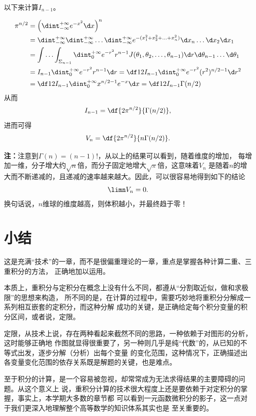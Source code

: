 以下来计算$I_{n-1}$。

\begin{align*}
	\pi^{n/2}&=\left(\dint_{-\infty}^{+\infty}e^{-x^2}\d x\right)^n\\
	&=\dint_{-\infty}^{+\infty}\dint_{-\infty}^{+\infty}\ldots
	\dint_{-\infty}^{+\infty}e^{-(x_1^2+x_2^2+\ldots+x_n^2)}\d x_n\ldots
	\d x_2\d x_1\\
	&=\int\ldots\int_{\Sigma_{n-1}}\dint_0^{+\infty}
	e^{-r^2}r^{n-1}J(\theta_1,\theta_2,\ldots,\theta_{n-1})
	\d r\d\theta_{n-1}\ldots\d\theta_1\\
	&=I_{n-1}\dint_0^{+\infty}e^{-r^2}r^{n-1}\d r
	=\df12I_{n-1}\dint_0^{+\infty}e^{-r^2}(r^2)^{n/2-1}\d r^2\\
	&=\df12I_{n-1}\dint_0^{+\infty}x^{n/2-1}e^{-x}\d x
	=\df12I_{n-1}\Gamma(n/2)
\end{align*}
从而
$$I_{n-1}=\df{2\pi^{n/2}}{\Gamma(n/2)},$$
进而可得
$$V_n=\df{2\pi^{n/2}}{n\Gamma(n/2)}.$$

{\bf 注：}注意到$\Gamma(n)=(n-1)!$，从以上的结果可以看到，随着维度的增加，
每增加一维，分子增大约$\sqrt{n}$倍，而分子固定地增大$\sqrt{\pi}$倍，这意味着$V_n$
是随着$n$的增大而不断递减的，且递减的速率越来越大。因此，可以很容易地得到如下的结论
$$\limn V_n=0.$$
换句话说，$n$维球的维度越高，则体积越小，并最终趋于零！

\section{小结}

这是充满“技术”的一章，而不是很偏重理论的一章，重点是掌握各种计算二重、三重积分的方法，
正确地加以运用。

本质上，重积分与定积分在概念上没有什么不同，都遵从“分割取近似，做和求极限”的思想来构造，
所不同的是，在计算的过程中，需要巧妙地将重积分分解成一系列相互嵌套的定积分，而这种分解
成功的关键，是正确给定每个积分变量的积分区间，或者说，定限。

定限，从技术上说，存在两种看起来截然不同的思路，一种依赖于对图形的分析，这时能够正确地
作图就显得很重要了，另一种则几乎是纯“代数”的，从已知的不等式出发，逐步分解（分析）出每个变量
的变化范围，这种情况下，正确描述出各变量变化范围的依存关系既是解题的关键，也是难点。

至于积分的计算，是一个容易被忽视，却常常成为无法求得结果的主要障碍的问题。从这个意义上
说，重积分计算的技术很大程度上还是要依赖于对定积分的掌握，事实上，本学期大多数的章节都
可以看到一元函数微积分的影子，这一点对于我们更深入地理解整个高等数学的知识体系其实也是
至关重要的。

